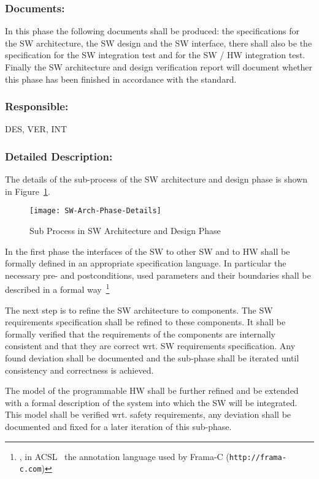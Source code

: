 \subsubsection{Documents:}
\label{sec:sw-arch-documents}
In this phase the following documents shall be produced: the
specifications for the SW architecture, the SW design and the SW interface,
there shall also be the specification for the SW integration test and for the SW
/ HW integration test. Finally the SW architecture and design verification
report will document whether this phase has been finished in accordance with
the standard.

\subsubsection{Responsible:}
\label{sec:sw-arch-responsible}
DES, VER, INT

\subsubsection{Detailed Description:}
\label{sec:sw-arch-deta-descr}
The details of the sub-process of the SW architecture and design phase is shown
in Figure~\ref{fig:detailed-sw-arch-phase}.

\begin{figure}[ht]
  \centering
  \texttt{[image: SW-Arch-Phase-Details]}
  \caption{Sub Process in SW Architecture and Design Phase}
  \label{fig:detailed-sw-arch-phase}
\end{figure}

In the first phase the interfaces of the SW to other SW and to HW shall be
formally defined in an appropriate specification language. In particular the
necessary pre- and postconditions, used parameters and their boundaries shall be
described in a formal way~\footnote{\eg, in ACSL~\cite{baudin09acsl} the
  annotation language used by Frama-C ({\tt http://frama-c.com})}

The next step is to refine the SW architecture to components. The SW
requirements specification shall be refined to these components. It shall be
formally verified that the requirements of the components are internally
consistent and that they are correct wrt. SW requirements specification. Any
found deviation shall be documented and the sub-phase shall be iterated until
consistency and correctness is achieved.

The model of the programmable HW shall be further refined and be extended with a
formal description of the system into which the SW will be integrated. This
model shall be verified wrt. safety requirements, any deviation shall be
documented and fixed for a later iteration of this sub-phase.

